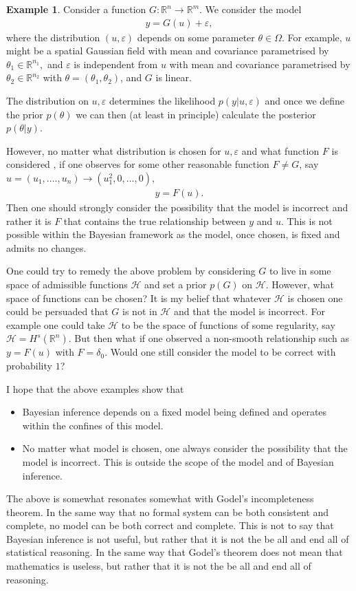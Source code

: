\documentclass[
    a4paper,
    DIV=14,
    abstract=true,
    numbers=noenddot
]
{scrartcl}
\theoremstyle{definition}
\newtheorem{example}[theorem]{Example}
\newcommand{\R}{\mathbb{R}}
\newcommand{\Hh}{\mathcal{H}}
\begin{document}
\begin{example}
    Consider a function $G: \R^n \to \R^m $. We consider the model
    \begin{align*}
        y=G(u)+ \varepsilon,
    \end{align*}
    where the distribution  $(u,\varepsilon)$ depends on some parameter $\theta \in \Omega$. For example, $u$ might be a spatial Gaussian field with mean and covariance parametrised by  $\theta_1 \in \R^{n_1},$ and $\varepsilon$ is independent from $u$  with mean and covariance parametrised by $\theta _2 \in \R^{n_2}$ with $\theta =(\theta _1, \theta _2 )$, and $G$ is linear.

    The distribution on $u,\varepsilon $ determines the likelihood $p(y|u,\varepsilon )$ and once we define the prior $p(\theta )$ we can then (at least in principle) calculate the posterior $p(\theta |y)$.

    However, no matter what distribution is chosen for $u,\varepsilon $ and what function $F$ is considered , if one observes for some other reasonable function $F \neq G$, say $u=(u_1,....,u_n)\to (u_1^2,0,...,0)$,
    \begin{align*}
        y=F(u).
    \end{align*}
    Then one should strongly consider the possibility that the model is incorrect and rather it is $F$ that contains the true relationship between $y$ and $u$. This is not possible within the Bayesian framework as the model, once chosen, is fixed and admits no changes.

    One could try to remedy the above problem by considering $G$ to live in some space of admissible functions $ \Hh $ and set a prior $p(G)$ on $\Hh$. However, what space of functions can be chosen? It is my belief that whatever $\Hh $  is chosen one could be persuaded that $G$ is not in $\Hh $ and that the model is incorrect. For example one could take $\Hh $ to be the space of functions of some regularity, say $\Hh = H^s(\R^n)$. But then what if one observed a non-smooth relationship such as $y=F(u)$ with $F= \delta _0$. Would one still consider the model to be correct with probability $1$?
\end{example}
I hope that the above examples show that
\begin{itemize}
    \item Bayesian inference depends on a fixed model being defined and operates within the confines of this model.
    \item No matter what model is chosen, one  always consider the possibility that the model is incorrect. This is outside the scope of the model and of Bayesian inference.
\end{itemize}
The above is somewhat resonates somewhat with Godel's incompleteness theorem. In the same way that no formal system can be both consistent and complete, no model can be both correct and complete. This is not to say that Bayesian inference is not useful, but rather that it is not the be all and end all of statistical reasoning. In the same way that Godel's theorem does not mean that mathematics is useless, but rather that it is not the be all and end all of reasoning.
\end{document}
